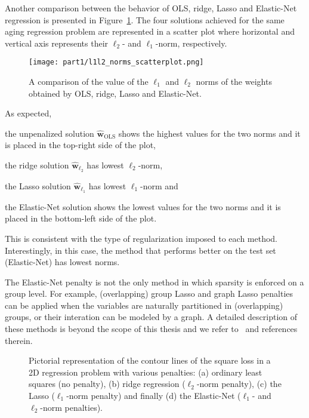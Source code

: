 			Another comparison between the behavior of OLS, ridge, Lasso and Elastic-Net regression is presented in Figure~\ref{fig:l1l2_norms_scatterplot}. The four solutions achieved for the same aging regression problem are represented in a scatter plot where horizontal and vertical axis represents their $\ell_2$- and $\ell_1$-norm, respectively.
			\begin{figure}[!h]
				\centering
				\texttt{[image: part1/l1l2\_norms\_scatterplot.png]}
				\caption{A comparison of the value of the $\ell_1$ and $\ell_2$ norms of the weights obtained by OLS, ridge, Lasso and Elastic-Net.} \label{fig:l1l2_norms_scatterplot}
		  \end{figure}
			As expected,
			\begin{enumerate*}[label=(\roman*)]
				\item the unpenalized solution $\bm{\hat w}_{\text{OLS}}$ shows the highest values for the two norms and it is placed in the top-right side of the plot,
				\item the ridge solution $\bm{\hat w}_{\ell_2}$ has lowest $\ell_2$-norm,
				\item the Lasso solution $\bm{\hat w}_{\ell_1}$ has lowest $\ell_1$-norm and
				\item the Elastic-Net solution shows the lowest values for the two norms and it is placed in the bottom-left side of the plot.
		  \end{enumerate*}
			This is consistent with the type of regularization imposed to each method. Interestingly, in this case, the method that performs better on the test set (Elastic-Net) has lowest norms.

			The Elastic-Net penalty is not the only method in which sparsity is enforced on a group level. For example, (overlapping) group Lasso and graph Lasso penalties can be applied when the variables are naturally partitioned in (overlapping) groups, or their interation can be modeled by a graph. A detailed description of these methods is beyond the scope of this thesis and we refer to~\cite{jacob2009group} and references therein.

			\begin{figure}[h!]
				\centering
				\hfill%
				\caption{Pictorial representation of the contour lines of the square loss in a 2D regression problem with various penalties: (a) ordinary least squares (no penalty), (b) ridge regression ($\ell_2$-norm penalty), (c) the Lasso ($\ell_1$-norm penalty) and finally (d) the Elastic-Net ($\ell_1$- and $\ell_2$-norm penalties).} \label{fig:square_loss_penalties}
			\end{figure}

